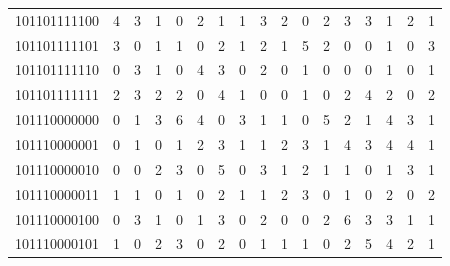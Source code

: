 \documentclass[10pt,a4paper]{article}
\begin{document}
\begin{longtable}{ |c|c|c|c|c|c|c|c|c|c|c|c|c|c|c|c|c| }
    101101111100              & 4                            & 3                                & 1                            & 0                              & 2   & 1   & 1   & 3   & 2   & 0   & 2   & 3   & 3   & 1   & 2   & 1   \\
    101101111101              & 3                            & 0                                & 1                            & 1                              & 0   & 2   & 1   & 2   & 1   & 5   & 2   & 0   & 0   & 1   & 0   & 3   \\
    101101111110              & 0                            & 3                                & 1                            & 0                              & 4   & 3   & 0   & 2   & 0   & 1   & 0   & 0   & 0   & 1   & 0   & 1   \\
    101101111111              & 2                            & 3                                & 2                            & 2                              & 0   & 4   & 1   & 0   & 0   & 1   & 0   & 2   & 4   & 2   & 0   & 2   \\
    101110000000              & 0                            & 1                                & 3                            & 6                              & 4   & 0   & 3   & 1   & 1   & 0   & 5   & 2   & 1   & 4   & 3   & 1   \\
    101110000001              & 0                            & 1                                & 0                            & 1                              & 2   & 3   & 1   & 1   & 2   & 3   & 1   & 4   & 3   & 4   & 4   & 1   \\
    101110000010              & 0                            & 0                                & 2                            & 3                              & 0   & 5   & 0   & 3   & 1   & 2   & 1   & 1   & 0   & 1   & 3   & 1   \\
    101110000011              & 1                            & 1                                & 0                            & 1                              & 0   & 2   & 1   & 1   & 2   & 3   & 0   & 1   & 0   & 2   & 0   & 2   \\
    101110000100              & 0                            & 3                                & 1                            & 0                              & 1   & 3   & 0   & 2   & 0   & 0   & 2   & 6   & 3   & 3   & 1   & 1   \\
    101110000101              & 1                            & 0                                & 2                            & 3                              & 0   & 2   & 0   & 1   & 1   & 1   & 0   & 2   & 5   & 4   & 2   & 1   \\

\end{longtable}
\end{document}

